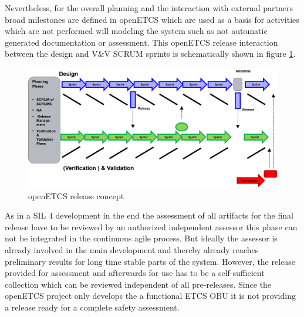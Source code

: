 Nevertheless, for the overall planning and the interaction with external partners broad milestones are defined in openETCS which are used as a basis for activities which are not performed will modeling the system such as not automatic generated documentation or assessment. This openETCS release interaction between the design and V\&V SCRUM sprints is schematically shown in figure \ref{fig:openETCSReleases}.

\begin{figure}[hbt]
\centering
\includegraphics[width=0.95\linewidth]{./images/openETCS_release-concept}
\caption{openETCS release concept}
\label{fig:openETCSReleases}
\end{figure}

As in a SIL 4 development in the end the assessment of all artifacts for the final release have to be reviewed by an authorized independent assessor this phase can not be integrated in the continuous agile process. But ideally the assessor is already involved in the main development and thereby already reaches  preliminary results for long time stable parts of the system. However, the release provided for assessment and afterwards for use has to be a self-sufficient collection which can be reviewed independent of all pre-releases. Since the openETCS project only develops the a functional ETCS OBU it is not providing a release ready for a complete safety assessment. 
 


%






